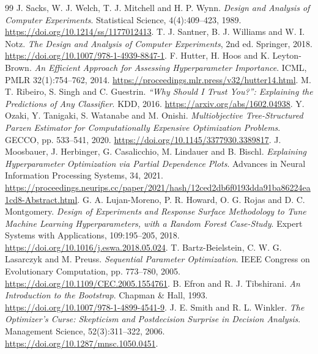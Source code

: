 \begin{thebibliography}{99}
 J. Sacks, W. J. Welch, T. J. Mitchell and H. P. Wynn. \emph{Design and Analysis of Computer Experiments}. Statistical Science, 4(4):409--423, 1989. \url{https://doi.org/10.1214/ss/1177012413}.
 T. J. Santner, B. J. Williams and W. I. Notz. \emph{The Design and Analysis of Computer Experiments}, 2nd ed. Springer, 2018. \url{https://doi.org/10.1007/978-1-4939-8847-1}.
 F. Hutter, H. Hoos and K. Leyton-Brown. \emph{An Efficient Approach for Assessing Hyperparameter Importance}. ICML, PMLR 32(1):754--762, 2014. \url{https://proceedings.mlr.press/v32/hutter14.html}.
 M. T. Ribeiro, S. Singh and C. Guestrin. \emph{``Why Should I Trust You?'': Explaining the Predictions of Any Classifier}. KDD, 2016. \url{https://arxiv.org/abs/1602.04938}.
 Y. Ozaki, Y. Tanigaki, S. Watanabe and M. Onishi. \emph{Multiobjective Tree-Structured Parzen Estimator for Computationally Expensive Optimization Problems}. GECCO, pp. 533--541, 2020. \url{https://doi.org/10.1145/3377930.3389817}.
 J. Moosbauer, J. Herbinger, G. Casalicchio, M. Lindauer and B. Bischl. \emph{Explaining Hyperparameter Optimization via Partial Dependence Plots}. Advances in Neural Information Processing Systems, 34, 2021. \url{https://proceedings.neurips.cc/paper/2021/hash/12ced2db6f0193dda91ba86224ea1cd8-Abstract.html}.
 G. A. Lujan-Moreno, P. R. Howard, O. G. Rojas and D. C. Montgomery. \emph{Design of Experiments and Response Surface Methodology to Tune Machine Learning Hyperparameters, with a Random Forest Case-Study}. Expert Systems with Applications, 109:195--205, 2018. \url{https://doi.org/10.1016/j.eswa.2018.05.024}.
 T. Bartz-Beielstein, C. W. G. Lasarczyk and M. Preuss. \emph{Sequential Parameter Optimization}. IEEE Congress on Evolutionary Computation, pp. 773--780, 2005. \url{https://doi.org/10.1109/CEC.2005.1554761}.
 B. Efron and R. J. Tibshirani. \emph{An Introduction to the Bootstrap}. Chapman \& Hall, 1993. \url{https://doi.org/10.1007/978-1-4899-4541-9}.
 J. E. Smith and R. L. Winkler. \emph{The Optimizer's Curse: Skepticism and Postdecision Surprise in Decision Analysis}. Management Science, 52(3):311--322, 2006. \url{https://doi.org/10.1287/mnsc.1050.0451}.
\end{thebibliography}
